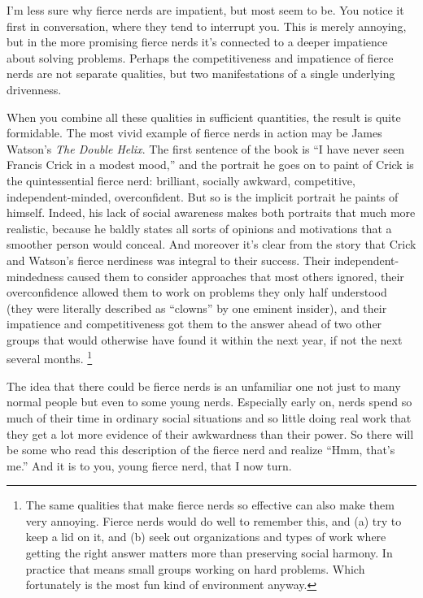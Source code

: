 I'm less sure why fierce nerds are impatient, but most seem to be. You
notice it first in conversation, where they tend to interrupt you. This
is merely annoying, but in the more promising fierce nerds it's
connected to a deeper impatience about solving problems. Perhaps the
competitiveness and impatience of fierce nerds are not separate
qualities, but two manifestations of a single underlying drivenness.

When you combine all these qualities in sufficient quantities, the
result is quite formidable. The most vivid example of fierce nerds in
action may be James Watson's \emph{The Double Helix}. The first sentence
of the book is ``I have never seen Francis Crick in a modest mood,'' and
the portrait he goes on to paint of Crick is the quintessential fierce
nerd: brilliant, socially awkward, competitive, independent-minded,
overconfident. But so is the implicit portrait he paints of himself.
Indeed, his lack of social awareness makes both portraits that much more
realistic, because he baldly states all sorts of opinions and
motivations that a smoother person would conceal. And moreover it's
clear from the story that Crick and Watson's fierce nerdiness was
integral to their success. Their independent-mindedness caused them to
consider approaches that most others ignored, their overconfidence
allowed them to work on problems they only half understood (they were
literally described as ``clowns'' by one eminent insider), and their
impatience and competitiveness got them to the answer ahead of two other
groups that would otherwise have found it within the next year, if not
the next several months. \footnote{The same qualities that make fierce nerds so effective can also
make them very annoying. Fierce nerds would do well to remember this,
and (a) try to keep a lid on it, and (b) seek out organizations and
types of work where getting the right answer matters more than
preserving social harmony. In practice that means small groups working
on hard problems. Which fortunately is the most fun kind of environment
anyway.}

The idea that there could be fierce nerds is an unfamiliar one not just
to many normal people but even to some young nerds. Especially early on,
nerds spend so much of their time in ordinary social situations and so
little doing real work that they get a lot more evidence of their
awkwardness than their power. So there will be some who read this
description of the fierce nerd and realize ``Hmm, that's me.'' And it is
to you, young fierce nerd, that I now turn.

